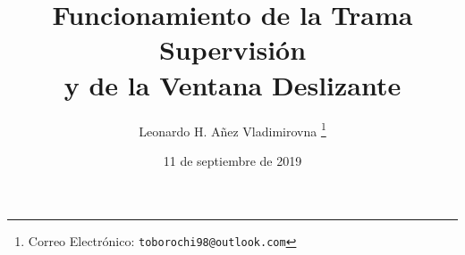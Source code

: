 

\title{Funcionamiento de la Trama Supervisión\\ y de la Ventana Deslizante}

\author{Leonardo H. Añez Vladimirovna%
  \thanks{Correo Electrónico: \texttt{toborochi98@outlook.com}}}
\date{11 de septiembre de 2019}

\maketitle




